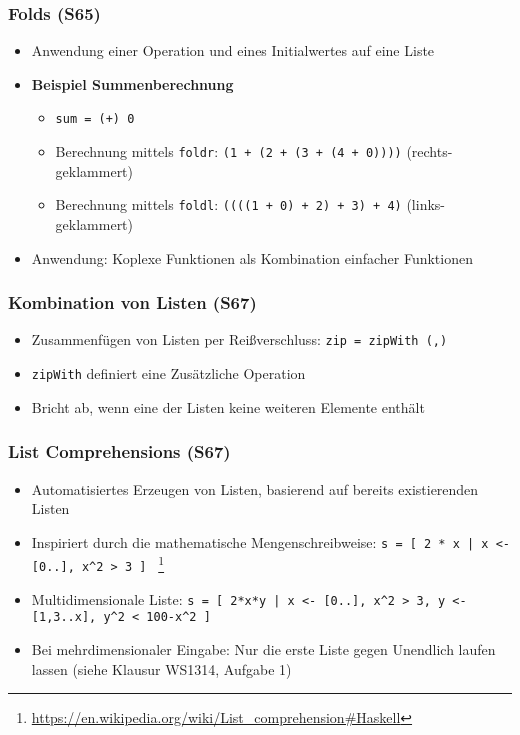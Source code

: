 \subsubsection{Folds (S65)}
\begin{itemize}
	\item Anwendung einer Operation und eines Initialwertes auf eine Liste
	\item \textbf{Beispiel Summenberechnung}
	\begin{itemize}
		\item \texttt{sum = (+) 0}
		\item Berechnung mittels \texttt{foldr}: \texttt{(1 + (2 + (3 + (4 + 0))))} (rechts-geklammert)
		\item Berechnung mittels \texttt{foldl}: \texttt{((((1 + 0) + 2) + 3) + 4)} (links-geklammert)
	\end{itemize}
	\item Anwendung: Koplexe Funktionen als Kombination einfacher Funktionen
\end{itemize}

\subsubsection{Kombination von Listen (S67)}
\begin{itemize}
	\item Zusammenfügen von Listen per Reißverschluss: \texttt{zip = zipWith (,)}
	\item \texttt{zipWith} definiert eine Zusätzliche Operation
	\item Bricht ab, wenn eine der Listen keine weiteren Elemente enthält
\end{itemize}

\subsubsection{List Comprehensions (S67)}
\begin{itemize}
	\item Automatisiertes Erzeugen von Listen, basierend auf bereits existierenden Listen
	\item Inspiriert durch die mathematische Mengenschreibweise: \texttt{s = {[} 2 * x {|} x <- {[}0..{]}, x\textasciicircum 2 > 3 {]} } \footnote{\url{https://en.wikipedia.org/wiki/List_comprehension\#Haskell}}
	\item Multidimensionale Liste: \texttt{s = {[} 2*x*y {|} x <- {[}0..{]}, x\textasciicircum2 > 3, y <- {[}1,3..x{]}, y\textasciicircum2 < 100-x\textasciicircum2 {]}}
	\item Bei mehrdimensionaler Eingabe: Nur die erste Liste gegen Unendlich laufen lassen (siehe Klausur WS1314, Aufgabe 1)
\end{itemize}


